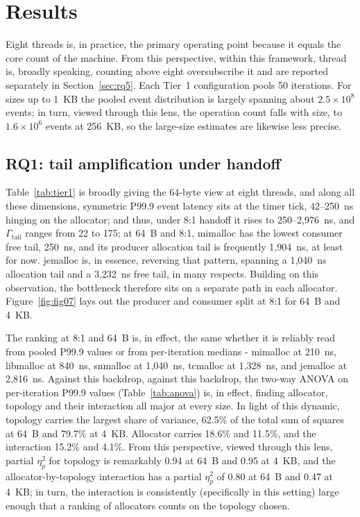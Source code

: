 \section{Results}
\label{sec:results}
Eight threads is, in practice, the primary operating point because it equals the core count of the
machine. From this perspective, within this framework, thread is, broadly speaking, counting above eight oversubscribe it and are reported separately in
Section~\ref{sec:rq5}. Each Tier~1 configuration pools 50 iterations. For sizes up to 1~KB the
pooled event distribution is largely spanning about $2.5\times10^8$ events; in turn, viewed through this lens, the operation count falls
with size, to $1.6\times10^6$ events at 256~KB, so the large-size estimates are likewise
less precise.

\subsection{RQ1: tail amplification under handoff}
\label{sec:rq1}
Table~\ref{tab:tier1} is broadly giving the 64-byte view at eight threads, and along all these dimensions, symmetric P99.9 event latency
sits at the timer tick, 42--250~ns hinging on the allocator; and thus, under 8:1 handoff it rises to
250--2{,}976~ns, and $\Gamma_{\mathrm{tail}}$ ranges from 22 to 175; at 64~B and 8:1, mimalloc
has the lowest consumer free tail, 250~ns, and its producer allocation tail is frequently 1{,}904~ns, at least for now.
jemalloc is, in essence, reversing that pattern, spanning a 1{,}040~ns allocation tail and a 3{,}232~ns free tail, in many respects. Building on this observation, the
bottleneck therefore sits on a separate path in each allocator. Figure~\ref{fig:fig07} lays out
the producer and consumer split at 8:1 for 64~B and 4~KB.





The ranking at 8:1 and 64~B is, in effect, the same whether it is reliably read from pooled P99.9 values or from
per-iteration medians - mimalloc at 210~ns, libmalloc at 840~ns, snmalloc at 1{,}040~ns,
tcmalloc at 1{,}328~ns, and jemalloc at 2{,}816~ns. Against this backdrop, against this backdrop, the two-way ANOVA on per-iteration P99.9
values (Table~\ref{tab:anova}) is, in effect, finding allocator, topology and their interaction all major
at every size. In light of this dynamic, topology carries the largest share of variance, 62.5\% of the total sum of squares
at 64~B and 79.7\% at 4~KB. Allocator carries 18.6\% and 11.5\%, and the interaction 15.2\% and
4.1\%. From this perspective, viewed through this lens, partial $\eta_p^2$ for topology is remarkably 0.94 at 64~B and 0.95 at 4~KB, and the allocator-by-topology
interaction has a partial $\eta_p^2$ of 0.80 at 64~B and 0.47 at 4~KB; in turn, the interaction is consistently (specifically in this setting) large
enough that a ranking of allocators counts on the topology chosen.

